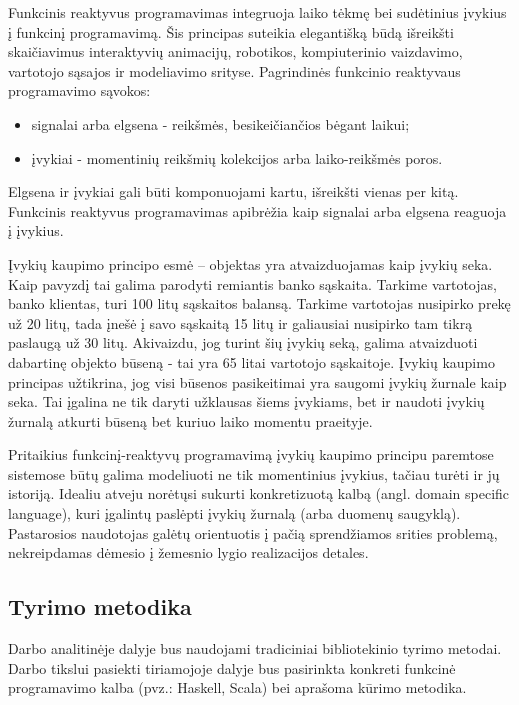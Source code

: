 \documentclass[12pt, a4paper, lithuanian]{article}
\begin{document}
    Funkcinis reaktyvus programavimas integruoja laiko tėkmę bei sudėtinius įvykius į funkcinį programavimą. Šis principas suteikia elegantišką būdą išreikšti skaičiavimus interaktyvių animacijų, robotikos, kompiuterinio vaizdavimo, vartotojo sąsajos ir modeliavimo srityse. Pagrindinės funkcinio reaktyvaus programavimo sąvokos:

\begin{itemize}
        \item signalai arba elgsena - reikšmės, besikeičiančios bėgant laikui;
        \item įvykiai - momentinių reikšmių kolekcijos arba laiko-reikšmės poros.
\end{itemize}

    Elgsena ir įvykiai gali būti komponuojami kartu, išreikšti vienas per kitą. Funkcinis reaktyvus programavimas apibrėžia kaip signalai arba elgsena reaguoja į įvykius.

    Įvykių kaupimo principo esmė – objektas yra atvaizduojamas kaip įvykių seka. Kaip pavyzdį tai galima parodyti remiantis banko sąskaita. Tarkime vartotojas, banko klientas, turi 100 litų sąskaitos balansą. Tarkime vartotojas nusipirko prekę už 20 litų, tada įnešė į savo sąskaitą 15 litų ir galiausiai nusipirko tam tikrą paslaugą už 30 litų. Akivaizdu, jog turint šių įvykių seką, galima atvaizduoti dabartinę objekto būseną - tai yra 65 litai vartotojo sąskaitoje. Įvykių kaupimo principas užtikrina, jog visi būsenos pasikeitimai yra saugomi įvykių žurnale kaip seka. Tai įgalina ne tik daryti užklausas šiems įvykiams, bet ir naudoti įvykių žurnalą atkurti būseną bet kuriuo laiko momentu praeityje.

    Pritaikius funkcinį-reaktyvų programavimą įvykių kaupimo principu paremtose sistemose būtų galima modeliuoti ne tik momentinius įvykius, tačiau turėti ir jų istoriją. Idealiu atveju norėtųsi sukurti konkretizuotą kalbą (angl. domain specific language), kuri įgalintų paslėpti įvykių žurnalą (arba duomenų saugyklą). Pastarosios naudotojas galėtų orientuotis į pačią sprendžiamos srities problemą, nekreipdamas dėmesio į žemesnio lygio realizacijos detales.

\subsection{Tyrimo metodika}

    Darbo analitinėje dalyje bus naudojami tradiciniai bibliotekinio tyrimo metodai. Darbo tikslui pasiekti tiriamojoje dalyje bus pasirinkta konkreti funkcinė programavimo kalba (pvz.: Haskell, Scala) bei aprašoma kūrimo metodika.
\end{document}
